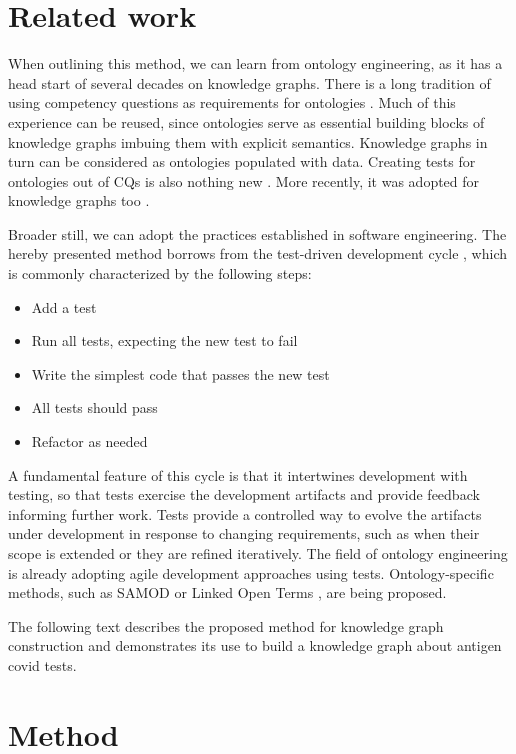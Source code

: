 \documentclass[
]{ceurart}
\begin{document}
\section{Related work}
When outlining this method, we can learn from ontology engineering, as it has a head start of several decades on knowledge graphs. There is a long tradition of using competency questions as requirements for ontologies \cite{Gruninger1994}. Much of this experience can be reused, since ontologies serve as essential building blocks of knowledge graphs imbuing them with explicit semantics. Knowledge graphs in turn can be considered as ontologies populated with data. Creating tests for ontologies out of CQs is also nothing new \cite{Ren2014,Zemmouchi2013}. More recently, it was adopted for knowledge graphs too \cite{Pan2017}.

Broader still, we can adopt the practices established in software engineering. The hereby presented method borrows from the test-driven development cycle \cite{Beck2003}, which is commonly characterized by the following steps:
\begin{itemize}
    \item Add a test
    \item Run all tests, expecting the new test to fail
    \item Write the simplest code that passes the new test
    \item All tests should pass
    \item Refactor as needed
\end{itemize}

A fundamental feature of this cycle is that it intertwines development with testing, so that tests exercise the development artifacts and provide feedback informing further work. Tests provide a controlled way to evolve the artifacts under development in response to changing requirements, such as when their scope is extended or they are refined iteratively. The field of ontology engineering is already adopting agile development approaches using tests. Ontology-specific methods, such as SAMOD \cite{Peroni2016} or Linked Open Terms \cite{PovedaVillalon2022}, are being proposed.

The following text describes the proposed method for knowledge graph construction and demonstrates its use to build a knowledge graph about antigen covid tests.

\section{Method}

\end{document}
